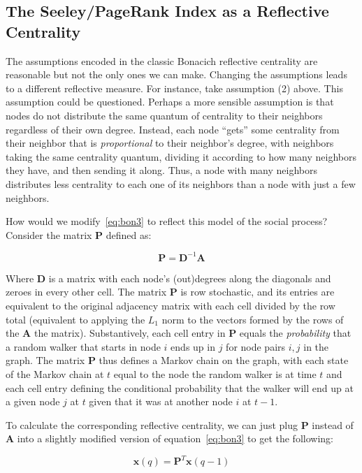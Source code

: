 \documentclass[a4paper,fleqn]{cas-sc}
\begin{document}
\subsection{The Seeley/PageRank Index as a Reflective Centrality}
The assumptions encoded in the classic Bonacich reflective centrality are reasonable but not the only ones we can make. Changing the assumptions leads to a different reflective measure. For instance, take assumption (2) above. This assumption could be questioned. Perhaps a more sensible assumption is that nodes do not distribute the same quantum of centrality to their neighbors regardless of their own degree. Instead, each node ``gets'' some centrality from their neighbor that is \textit{proportional} to their neighbor's degree, with neighbors taking the same centrality quantum, dividing it according to how many neighbors they have, and then sending it along. Thus, a node with many neighbors distributes less centrality to each one of its neighbors than a node with just a few neighbors.

How would we modify~\ref{eq:bon3} to reflect this model of the social process? Consider the matrix $\mathbf{P}$ defined as:

\begin{equation}
    \mathbf{P} = \mathbf{D}^{-1} \mathbf{A}
\end{equation}

Where $\mathbf{D}$ is a matrix with each node's (out)degrees along the diagonals and zeroes in every other cell. The matrix $\mathbf{P}$ is row stochastic, and its entries are equivalent to the original adjacency matrix with each cell divided by the row total (equivalent to applying the $L_1$ norm to the vectors formed by the rows of the $\mathbf{A}$ the matrix). Substantively, each cell entry in $\mathbf{P}$ equals the \textit{probability} that a random walker that starts in node $i$ ends up in $j$ for node pairs $i,j$ in the graph. The matrix $\mathbf{P}$ thus defines a Markov chain on the graph, with each state of the Markov chain at $t$ equal to the node the random walker is at time $t$ and each cell entry defining the conditional probability that the walker will end up at a given node $j$ at $t$ given that it was at another node $i$ at $t-1$.

To calculate the corresponding reflective centrality, we can just plug $\mathbf{P}$ instead of $\mathbf{A}$ into a slightly modified version of equation~\ref{eq:bon3} to get the following:

\begin{equation}
    \mathbf{x}(q) = \mathbf{P}^T \mathbf{x}(q - 1)
    \label{eq:seeley1}
\end{equation}
\end{document}
